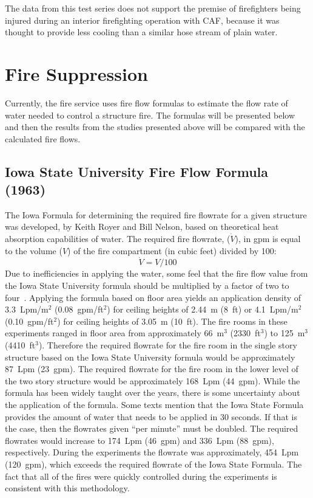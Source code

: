 \documentclass[12pt,oneside]{book}
\begin{document}
The data from this test series does not support the premise of firefighters being injured during an interior firefighting operation with CAF, because it was thought to provide less cooling than a similar hose stream of plain water.

\section{Fire Suppression}
\label{sec:Fire_Suppression_discussion}

Currently, the fire service uses fire flow formulas to estimate the flow rate of water needed to control a structure fire. The formulas will be presented below and then the results from the studies presented above will be compared with the calculated fire flows.

\subsection{Iowa State University Fire Flow Formula (1963)}
The Iowa Formula for determining the required fire flowrate for a given structure was developed, by Keith Royer and Bill Nelson, based on theoretical heat absorption capabilities of water. The required fire flowrate, ($\dot{V}$), in gpm is equal to the volume ($V$) of the fire compartment (in cubic feet) divided by 100:
\begin{equation}\label{eq:isu_form}
\dot{V} = V / 100
\end{equation}
Due to inefficiencies in applying the water, some feel that the fire flow value from the Iowa State University formula should be multiplied by a factor of two to four~\cite{NFPA}. Applying the formula based on floor area yields an application density of 3.3~Lpm/m$^2$ (0.08~gpm/ft$^2$) for ceiling heights of 2.44~m (8~ft) or 4.1~Lpm/m$^2$ (0.10~gpm/ft$^2$) for ceiling heights of 3.05~m (10~ft). The fire rooms in these experiments ranged in floor area from approximately 66~m$^3$ (2330~ft$^3$) to 125~m$^3$ (4410~ft$^3$). Therefore the required flowrate for the fire room in the single story structure based on the Iowa State University formula would be approximately 87~Lpm (23~gpm). The required flowrate for the fire room in the lower level of the two story structure would be approximately 168~Lpm (44~gpm). While the formula has been widely taught over the years, there is some uncertainty about the application of the formula. Some texts mention that the Iowa State Formula provides the amount of water that needs to be applied in 30 seconds. If that is the case, then the flowrates given ``per minute'' must be doubled. The required flowrates would increase to 174~Lpm (46~gpm) and 336~Lpm (88~gpm), respectively. During the experiments the flowrate was approximately, 454~Lpm (120~gpm), which exceeds the required flowrate of the Iowa State Formula. The fact that all of the fires were quickly controlled  during the experiments is consistent with this methodology. 
\end{document}
